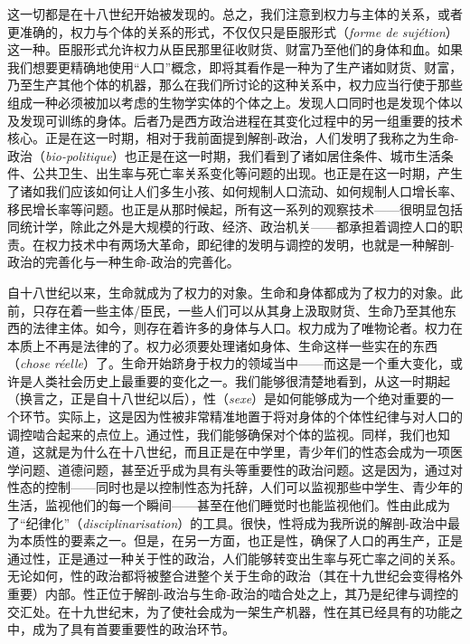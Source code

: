 \documentclass[fontset=fandol, a4paper, 12pt, twoside]{ctexart}
\newcommand{\fr}[1]{\textit{#1}}
\begin{document}
这一切都是在十八世纪开始被发现的。总之，我们注意到权力与主体的关系，或者更准确的，权力与个体的关系的形式，不仅仅只是臣服形式（\fr{forme de sujétion}）这一种。臣服形式允许权力从臣民那里征收财货、财富乃至他们的身体和血。如果我们想要更精确地使用“人口”概念，即将其看作是一种为了生产诸如财货、财富，乃至生产其他个体的机器，那么在我们所讨论的这种关系中，权力应当行使于那些组成一种必须被加以考虑的生物学实体的个体之上。发现人口同时也是发现个体以及发现可训练的身体。后者乃是西方政治进程在其变化过程中的另一组重要的技术核心。正是在这一时期，相对于我前面提到解剖-政治，人们发明了我称之为生命-政治（\fr{bio-politique}）也正是在这一时期，我们看到了诸如居住条件、城市生活条件、公共卫生、出生率与死亡率关系变化等问题的出现。也正是在这一时期，产生了诸如我们应该如何让人们多生小孩、如何规制人口流动、如何规制人口增长率、移民增长率等问题。也正是从那时候起，所有这一系列的观察技术——很明显包括同统计学，除此之外是大规模的行政、经济、政治机关——都承担着调控人口的职责。在权力技术中有两场大革命，即纪律的发明与调控的发明，也就是一种解剖-政治的完善化与一种生命-政治的完善化。

自十八世纪以来，生命就成为了权力的对象。生命和身体都成为了权力的对象。此前，只存在着一些主体/臣民，一些人们可以从其身上汲取财货、生命乃至其他东西的法律主体。如今，则存在着许多的身体与人口。权力成为了唯物论者。权力在本质上不再是法律的了。权力必须要处理诸如身体、生命这样一些实在的东西（\fr{chose réelle}）了。生命开始跻身于权力的领域当中——而这是一个重大变化，或许是人类社会历史上最重要的变化之一。我们能够很清楚地看到，从这一时期起（换言之，正是自十八世纪以后），性（\fr{sexe}）是如何能够成为一个绝对重要的一个环节。实际上，这是因为性被非常精准地置于将对身体的个体性纪律与对人口的调控啮合起来的点位上。通过性，我们能够确保对个体的监视。同样，我们也知道，这就是为什么在十八世纪，而且正是在中学里，青少年们的性态会成为一项医学问题、道德问题，甚至近乎成为具有头等重要性的政治问题。这是因为，通过对性态的控制——同时也是以控制性态为托辞，人们可以监视那些中学生、青少年的生活，监视他们的每一个瞬间——甚至在他们睡觉时也能监视他们。性由此成为了“纪律化”（\fr{disciplinarisation}）的工具。很快，性将成为我所说的解剖-政治中最为本质性的要素之一。但是，在另一方面，也正是性，确保了人口的再生产，正是通过性，正是通过一种关于性的政治，人们能够转变出生率与死亡率之间的关系。无论如何，性的政治都将被整合进整个关于生命的政治（其在十九世纪会变得格外重要）内部。性正位于解剖-政治与生命-政治的啮合处之上，其乃是纪律与调控的交汇处。在十九世纪末，为了使社会成为一架生产机器，性在其已经具有的功能之中，成为了具有首要重要性的政治环节。
\end{document}
